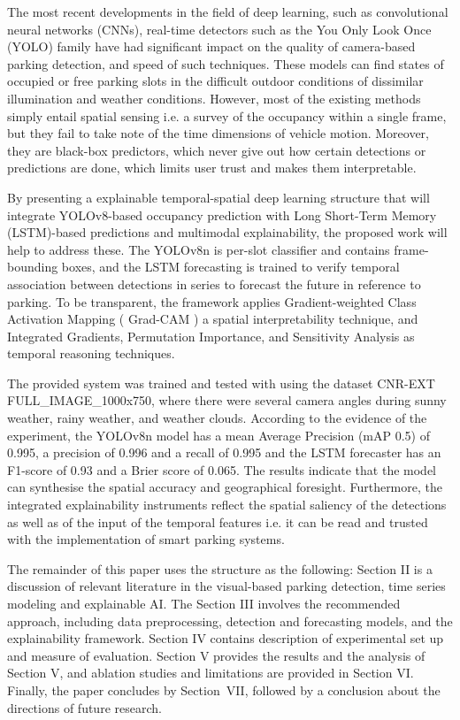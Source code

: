 \documentclass[conference]{IEEEtran}
\begin{document}
The most recent developments in the field of deep learning, such as convolutional neural networks (CNNs), real-time detectors such as the You Only Look Once (YOLO) family have had significant impact on the quality of camera-based parking detection, and speed of such techniques. These models can find states of occupied or free parking slots in the difficult outdoor conditions of dissimilar illumination and weather conditions. However, most of the existing methods simply entail spatial sensing i.e. a survey of the occupancy within a single frame, but they fail to take note of the time dimensions of vehicle motion. Moreover, they are black-box predictors, which never give out how certain detections or predictions are done, which limits user trust and makes them interpretable.

By presenting a explainable temporal-spatial deep learning structure that will integrate YOLOv8-based occupancy prediction with Long Short-Term Memory (LSTM)-based predictions and multimodal explainability, the proposed work will help to address these. The YOLOv8n is per-slot classifier and contains frame-bounding boxes, and the LSTM forecasting is trained to verify temporal association between detections in series to forecast the future in reference to parking. To be transparent, the framework applies Gradient-weighted Class Activation Mapping ( Grad-CAM ) a spatial interpretability technique, and Integrated Gradients, Permutation Importance, and Sensitivity Analysis as temporal reasoning techniques.

The provided system was trained and tested with using the dataset CNR-EXT FULL\_IMAGE\_1000x750, where there were several camera angles during sunny weather, rainy weather, and weather clouds. According to the evidence of the experiment, the YOLOv8n model has a mean Average Precision (mAP 0.5) of 0.995, a precision of 0.996 and a recall of 0.995 and the LSTM forecaster has an F1-score of 0.93 and a Brier score of 0.065. The results indicate that the model can synthesise the spatial accuracy and geographical foresight. Furthermore, the integrated explainability instruments reflect the spatial saliency of the detections as well as of the input of the temporal features i.e. it can be read and trusted with the implementation of smart parking systems.

The remainder of this paper uses the structure as the following: Section II is a discussion of relevant literature in the visual-based parking detection, time series modeling and explainable AI. The Section III involves the recommended approach, including data preprocessing, detection and forecasting models, and the explainability framework. Section IV contains description of experimental set up and measure of evaluation. Section V provides the results and the analysis of Section V, and ablation studies and limitations are provided in Section VI. Finally, the paper concludes by Section~VII, followed by a conclusion about the directions of future research.
\end{document}
